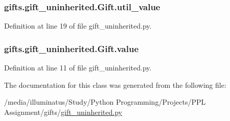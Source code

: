 \subsubsection[{\texorpdfstring{util\+\_\+value}{util_value}}]{\setlength{\rightskip}{0pt plus 5cm}gifts.\+gift\+\_\+uninherited.\+Gift.\+util\+\_\+value}\hypertarget{classgifts_1_1gift__uninherited_1_1_gift_a640df8d6eb45f9027260eb8053bb6b43}{}\label{classgifts_1_1gift__uninherited_1_1_gift_a640df8d6eb45f9027260eb8053bb6b43}


Definition at line 19 of file gift\+\_\+uninherited.\+py.

\subsubsection[{\texorpdfstring{value}{value}}]{\setlength{\rightskip}{0pt plus 5cm}gifts.\+gift\+\_\+uninherited.\+Gift.\+value}\hypertarget{classgifts_1_1gift__uninherited_1_1_gift_aea65e2d06b96ec3ab267e4e8dd1e91ff}{}\label{classgifts_1_1gift__uninherited_1_1_gift_aea65e2d06b96ec3ab267e4e8dd1e91ff}


Definition at line 11 of file gift\+\_\+uninherited.\+py.



The documentation for this class was generated from the following file\+:\begin{DoxyCompactItemize}
\item 
/media/illuminatus/\+Study/\+Python Programming/\+Projects/\+P\+P\+L Assignment/gifts/\hyperlink{gift__uninherited_8py}{gift\+\_\+uninherited.\+py}\end{DoxyCompactItemize}
